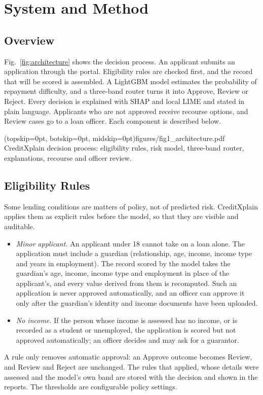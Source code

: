 \section{System and Method}
\label{sec:method}

\subsection{Overview}
Fig.~\ref{fig:architecture} shows the decision process. An applicant submits an application through the portal.
Eligibility rules are checked first, and the record that will be scored is assembled. A LightGBM model estimates the
probability of repayment difficulty, and a three-band router turns it into Approve, Review or Reject. Every decision
is explained with SHAP and local LIME and stated in plain language. Applicants who are not approved receive recourse
options, and Review cases go to a loan officer. Each component is described below.

\Figure[t!](topskip=0pt, botskip=0pt, midskip=0pt){figures/fig1_architecture.pdf}
{CreditXplain decision process: eligibility rules, risk model, three-band router, explanations, recourse and officer review.\label{fig:architecture}}

\subsection{Eligibility Rules}
\label{sec:eligibility}
Some lending conditions are matters of policy, not of predicted risk. CreditXplain applies them as explicit rules
before the model, so that they are visible and auditable.
\begin{itemize}
\item \emph{Minor applicant.} An applicant under 18 cannot take on a loan alone. The application must include a
guardian (relationship, age, income, income type and years in employment). The record scored by the model takes the
guardian's age, income, income type and employment in place of the applicant's, and every value derived from them is
recomputed. Such an application is never approved automatically, and an officer can approve it only after the
guardian's identity and income documents have been uploaded.
\item \emph{No income.} If the person whose income is assessed has no income, or is recorded as a student or
unemployed, the application is scored but not approved automatically; an officer decides and may ask for a guarantor.
\end{itemize}
A rule only removes automatic approval: an Approve outcome becomes Review, and Review and Reject are unchanged. The
rules that applied, whose details were assessed and the model's own band are stored with the decision and shown in the
reports. The thresholds are configurable policy settings.

